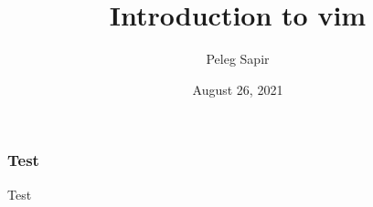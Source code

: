 \documentclass{beamer}
\title{Introduction to vim}
\author[Peleg Sapir]{Peleg Sapir}
\institute[exocad GmbH]{
  \inst{1}
	exocad GmbH
}
\date[vim 2021]{August 26, 2021}
\begin{document}
\frame{\titlepage}

\begin{frame}
	\frametitle{Test}
	Test
\end{frame}
\end{document}

